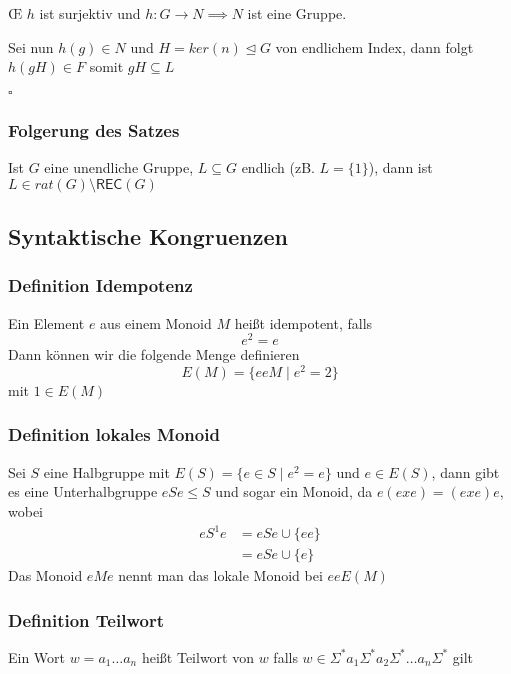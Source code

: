 \documentclass[12pt, german]{article}
\newcommand{\sigstern}{\Sigma^\ast}
\newcommand{\rec}{\mathsf{REC}}
\newcommand{\bewiesen}{
	
	\begin{flushright}
		$\square$  \\
\end{flushright}}
\begin{document}
	\OE $\, \, h$ ist surjektiv und $h:G \to N \implies N$  ist eine Gruppe. 
	
	Sei nun $h(g) \in N$ und $H= ker(n) \trianglelefteq G$ von endlichem Index, dann folgt $h(gH) \in F$ somit $gH \subseteq L$
	\bewiesen
	
	\subsubsection{Folgerung des Satzes}	
	Ist $G$ eine unendliche Gruppe, $L \subseteq G$ endlich (zB. $L = \{1\}$), dann ist $L \in rat(G) \setminus \rec(G)$
	
\subsection{Syntaktische Kongruenzen}
\subsubsection{Definition Idempotenz}
	Ein Element $e$ aus einem Monoid $M$ heißt idempotent, falls $$e^2 = e$$
	Dann können wir die folgende Menge definieren $$E(M) = \{ eeM \mid e^2 = 2\}$$ mit $1\in E(M)$
	
\subsubsection{Definition lokales Monoid}
	Sei $S$ eine Halbgruppe mit $E(S) = \{e \in S \mid e^2 = e\}$  und $e \in E(S)$, dann gibt es eine Unterhalbgruppe $eSe \leq S$ und sogar ein Monoid, da 	$e(exe) = (exe)e$, wobei 
	\begin{align*}
		eS^1e &= eSe \cup \{ee\} \\
		&=eSe \cup \{e\}
	\end{align*}
	Das Monoid $eMe$ nennt man das lokale Monoid bei $eeE(M)$
	
\subsubsection{Definition Teilwort}
	Ein Wort $w = a_1 \ldots a_n$ heißt Teilwort von $w$ falls $w \in \sigstern a_1 \sigstern a_2 \sigstern \ldots a_n\sigstern$ gilt
	
\end{document}
